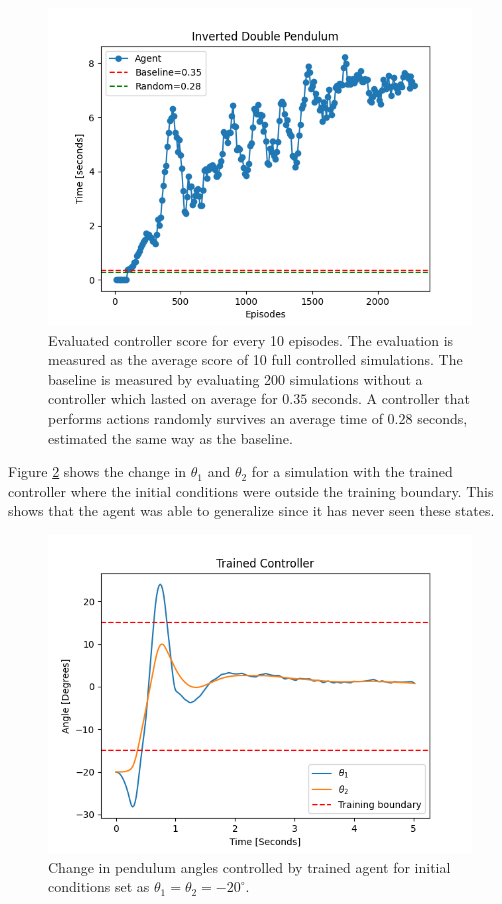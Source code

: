 \documentclass[final]{LTHtwocol} %
\begin{document}
\begin{figure}[H]
	\centering
	\includegraphics[width=0.9\columnwidth]{figures/Doublependulum_evaluation_time.png}
	\caption{Evaluated controller score for every 10 episodes. The evaluation is measured as the average score of 10 full controlled simulations. The baseline is measured by evaluating 200 simulations without a controller which lasted on average for $0.35$ seconds. A controller that performs actions randomly survives an average time of $0.28$ seconds, estimated the same way as the baseline.}
	\label{fig:double_pendulum_score}
\end{figure}
Figure \ref{fig:double_pendulum_trained_angles} shows the change in $\theta_1$ and $\theta_2$ for a simulation with the trained controller where the initial conditions were outside the training boundary.
This shows that the agent was able to generalize since it has never seen these states.
\begin{figure}[h]
	\centering
	\includegraphics[width=0.9\columnwidth]{figures/DoublePendulum_trained_angle.png}
	\caption{Change in pendulum angles controlled by trained agent for initial conditions set as $\theta_1=\theta_2=-20^{\circ}$.}
	\label{fig:double_pendulum_trained_angles}
\end{figure}
\end{document}
